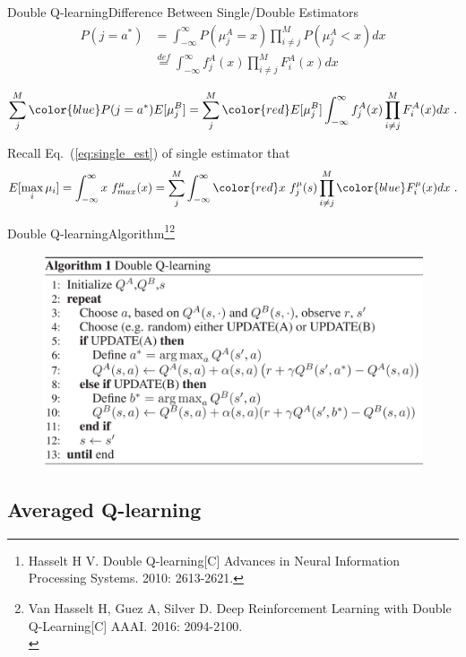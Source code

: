 \documentclass{beamer}
\newcommand{\red}[1]{{\color{red} #1}}
\newcommand{\blue}[1]{{\color{blue} #1}}
\begin{document}
\begin{frame}{Double Q-learning}{Difference Between Single/Double Estimators}
	\begin{equation}
	\begin{aligned}
		P(j=a^*) &= \int_{-\infty}^{\infty} P(\mu_j^A = x) \prod_{i\neq j}^M P(\mu_j^A <x) dx \\
		&\overset{def}{=} \int_{-\infty}^{\infty} f_j^A(x) \prod_{i\neq j}^M F_i^A(x) dx 
	\end{aligned}
	\end{equation}
	
	\begin{equation}\label{eq:double_est}
		\sum_j^M \blue{P(j=a^*)} E[\mu_j^B] = \sum_j^M \red{E[\mu_j^B]} \int_{-\infty}^{\infty} f_j^A(x) \prod_{i\neq j}^M F_i^A(x) dx ~.
	\end{equation}
	
	Recall Eq.~(\ref{eq:single_est}) of single estimator that
	\begin{equation}\nonumber
	E[\max_i \mu_i] = \int_{-\infty}^{\infty} x ~f_{max}^{\mu}(x) = \sum_j^M \int_{-\infty}^{\infty} \red{x} ~f_j^{\mu}(s) \prod_{i\neq j}^M \blue{F_i^{\mu}(x)} dx ~.
	\end{equation}
\end{frame}


\begin{frame}{Double Q-learning}{Algorithm\footnote{\tiny{Hasselt H V. Double Q-learning[C] Advances in Neural Information Processing Systems. 2010: 2613-2621.}}\footnote{\tiny{Van Hasselt H, Guez A, Silver D. Deep Reinforcement Learning with Double Q-Learning[C] AAAI. 2016: 2094-2100.}\\}}
	\begin{figure}[t]
		\includegraphics[width=0.7\columnwidth]{figures/double-q-learning-alg.jpg}
	\end{figure}
\end{frame}


\subsection{Averaged Q-learning}
\end{document}
